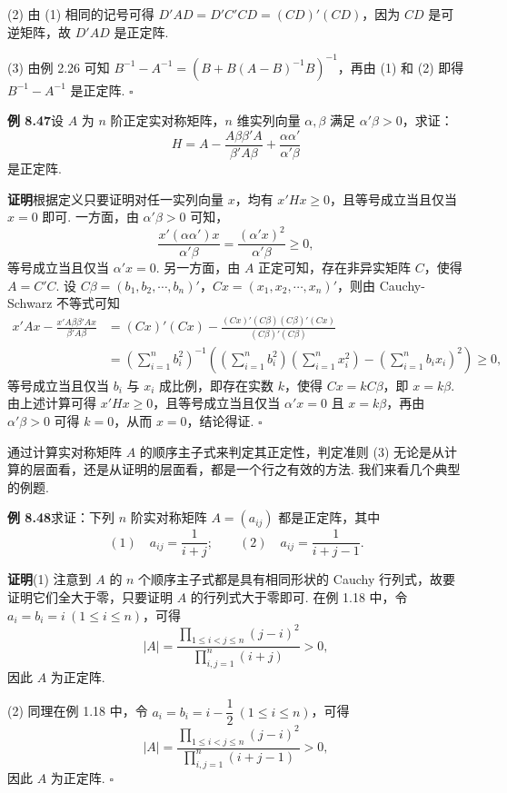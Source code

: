 \documentclass[UTF8,12pt,a4paper,fontset=fandol]{ctexart}
\begin{document}
(2) 由 (1) 相同的记号可得 $D'AD=D'C'CD=(CD)'(CD)$，因为 $CD$ 是可逆矩阵，故 $D'AD$ 是正定阵.

(3) 由例 2.26 可知 $B^{-1}-A^{-1}=(B+B(A-B)^{-1}B)^{-1}$，再由 (1) 和 (2) 即得 $B^{-1}-A^{-1}$ 是正定阵. $\ensuremath{\square}$

\noindent\textbf{例 8.47}\quad 设 $A$ 为 $n$ 阶正定实对称矩阵，$n$ 维实列向量 $\alpha,\beta$ 满足 $\alpha'\beta>0$，求证：
\[
H=A-\frac{A\beta\beta'A}{\beta'A\beta}+\frac{\alpha\alpha'}{\alpha'\beta}
\]
是正定阵.

\noindent\textbf{证明}\quad 根据定义只要证明对任一实列向量 $x$，均有 $x'Hx\ge 0$，且等号成立当且仅当 $x=0$ 即可. 一方面，由 $\alpha'\beta>0$ 可知，
\[
\frac{x'(\alpha\alpha')x}{\alpha'\beta}=\frac{(\alpha'x)^2}{\alpha'\beta}\ge 0,
\]
等号成立当且仅当 $\alpha'x=0$. 另一方面，由 $A$ 正定可知，存在非异实矩阵 $C$，使得 $A=C'C$. 设 $C\beta=(b_1,b_2,\cdots,b_n)'$，$Cx=(x_1,x_2,\cdots,x_n)'$，则由 Cauchy-Schwarz 不等式可知
\[
\begin{aligned}
x'Ax-\frac{x'A\beta\beta'Ax}{\beta'A\beta}
&=(Cx)'(Cx)-\frac{(Cx)'(C\beta)(C\beta)'(Cx)}{(C\beta)'(C\beta)}\\
&=\left(\sum_{i=1}^n b_i^2\right)^{-1}
\left(\left(\sum_{i=1}^n b_i^2\right)\left(\sum_{i=1}^n x_i^2\right)-\left(\sum_{i=1}^n b_ix_i\right)^2\right)\ge 0,
\end{aligned}
\]
等号成立当且仅当 $b_i$ 与 $x_i$ 成比例，即存在实数 $k$，使得 $Cx=kC\beta$，即 $x=k\beta$. 由上述计算可得 $x'Hx\ge 0$，且等号成立当且仅当 $\alpha'x=0$ 且 $x=k\beta$，再由 $\alpha'\beta>0$ 可得 $k=0$，从而 $x=0$，结论得证. $\ensuremath{\square}$

通过计算实对称矩阵 $A$ 的顺序主子式来判定其正定性，判定准则 (3) 无论是从计算的层面看，还是从证明的层面看，都是一个行之有效的方法. 我们来看几个典型的例题.

\noindent\textbf{例 8.48}\quad 求证：下列 $n$ 阶实对称矩阵 $A=(a_{ij})$ 都是正定阵，其中
\[
(1)\quad a_{ij}=\frac1{i+j};\qquad
(2)\quad a_{ij}=\frac1{i+j-1}.
\]

\noindent\textbf{证明}\quad (1) 注意到 $A$ 的 $n$ 个顺序主子式都是具有相同形状的 Cauchy 行列式，故要证明它们全大于零，只要证明 $A$ 的行列式大于零即可. 在例 1.18 中，令 $a_i=b_i=i\ (1\le i\le n)$，可得
\[
|A|=\frac{\prod_{1\le i<j\le n}(j-i)^2}{\prod_{i,j=1}^n(i+j)}>0,
\]
因此 $A$ 为正定阵.

(2) 同理在例 1.18 中，令 $a_i=b_i=i-\dfrac12\ (1\le i\le n)$，可得
\[
|A|=\frac{\prod_{1\le i<j\le n}(j-i)^2}{\prod_{i,j=1}^n(i+j-1)}>0,
\]
因此 $A$ 为正定阵. $\ensuremath{\square}$
\end{document}
